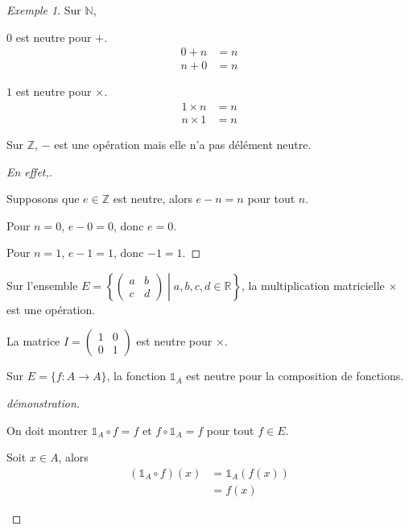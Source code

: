 \documentclass{report}
\newcommand*{\reels}{\mathbb{R}}
\newcommand*{\entiers}{\mathbb{Z}}
\newcommand*{\naturels}{\mathbb{N}}
\theoremstyle{definition}
\theoremstyle{remark}
\newtheorem*{exem}{Exemple}
\begin{document}
	\begin{exem}
		Sur $\naturels$,

		\begin{ulist}
			\item $0$ est neutre pour $+$.
			\begin{align*}
				0+n&=n\\
				n+0&=n
			\end{align*}
			\item $1$ est neutre pour $\times$.
			\begin{align*}
				1 \times n&=n\\
				n \times 1&=n
			\end{align*}
		\end{ulist}

		Sur $\entiers$, $-$ est une op\'eration mais elle n'a pas d\'el\'ement neutre.
		\renewcommand{\qedsymbol}{\lightning}
		\begin{proof}[En effet,]~

			Supposons que $e \in \entiers$ est neutre, alors $e-n=n$ pour tout $n$.

			Pour $n=0$, $e-0=0$, donc $e=0$.

			Pour $n=1$, $e-1=1$, donc $-1=1$.
		\end{proof}
		\renewcommand{\qedsymbol}{$\square$}
		\begin{ulist}
			\item Sur l'ensemble $E=\left\lbrace \left( \begin{array}{cc}
				a&b\\c&d
			\end{array}\right) \middle| a,b,c,d \in \reels\right\rbrace$, la multiplication matricielle $\times$ est une op\'eration.

			La matrice $I=\left( \begin{array}{cc}
				1&0\\0&1
			\end{array}\right)$ est neutre pour $\times$.
			\item Sur $E=\{f:A \to A\}$, la fonction $\mathds{1}_A$ est neutre pour la composition de fonctions.
			\begin{proof}[d\'emonstration]~

				On doit montrer $\mathds{1}_A \circ f=f$ et $f \circ \mathds{1}_A=f$ pour tout $f \in E$.
				\begin{nlist}
					\item Soit $x \in A$, alors
					\begin{align*}
						(\mathds{1}_A \circ f)(x)&= \mathds{1}_A(f(x))\\
						&= f(x)
					\end{align*}


\end{nlist}
\end{proof}
\end{ulist}
\end{exem}
\end{document}
